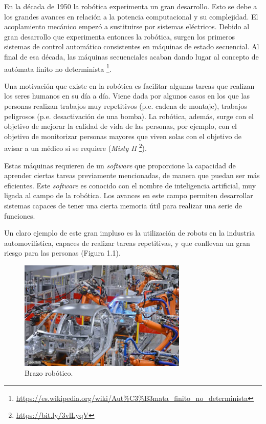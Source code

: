 \documentclass[a4paper, 12pt]{book}
\begin{document}
En la década de 1950 la robótica experimenta un gran desarrollo. Esto se debe a los grandes avances en relación a la potencia computacional y su complejidad. El acoplamiento mecánico empezó a sustituirse por sistemas eléctricos. Debido al gran desarrollo que experimenta entonces la robótica, surgen los primeros sistemas de control automático consistentes en máquinas de estado secuencial. Al final de esa década, las máquinas secuenciales acaban dando lugar al concepto de autómata finito no determinista \footnote{\url{https://es.wikipedia.org/wiki/Aut\%C3\%B3mata_finito_no_determinista}}.

Una motivación que existe en la robótica es facilitar algunas tareas que realizan los seres humanos en su día a día. Viene dada por algunos casos en los que las personas realizan trabajos muy repetitivos (p.e. cadena de montaje), trabajos peligrosos (p.e. desactivación de una bomba). La robótica, además, surge con el objetivo de mejorar la calidad de vida de las personas, por ejemplo, con el objetivo de monitorizar personas mayores que viven solas con el objetivo de avisar a un médico si se requiere (\emph{Misty II} \footnote{\url{https://bit.ly/3vlLyqV}}).


Estas máquinas requieren de un \emph{software} que proporcione la capacidad de aprender ciertas tareas previamente mencionadas, de manera que puedan ser más eficientes. Este \emph{software} es conocido con el nombre de inteligencia artificial, muy ligada al campo de la robótica. Los avances en este campo permiten desarrollar sistemas capaces de tener una cierta memoria útil para realizar una serie de funciones.


Un claro ejemplo de este gran impluso es la utilización de robots en la industria automovilística, capaces de realizar tareas repetitivas, y que conllevan un gran riesgo para las personas (Figura 1.1).


\begin{figure}[H]
	\centering
    \includegraphics[width=8cm, keepaspectratio]{img/brazo}
    \caption{Brazo robótico.}
    \label{figura:brazo_robotico}
\end{figure}
\end{document}
